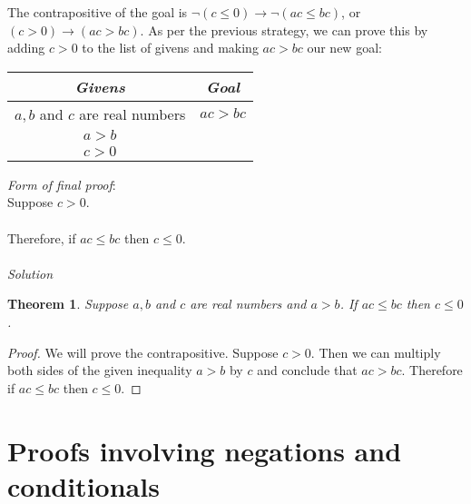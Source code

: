 \documentclass{report}
\newtheorem*{theorem}{Theorem}
\begin{document}
The contrapositive of the goal is $\neg(c\leq0)\to\neg(ac\leq bc)$, or $(c>0)\to(ac>bc)$. As per the previous strategy, we can prove this by adding $c>0$ to the list of givens 
and making $ac>bc$ our new goal:
\begin{center}
\begin{tabular}{c|c}
\textit{Givens}&\textit{Goal}\\
\hline
$a,b$ and $c$ are real numbers&$ac>bc$\\
$a>b$&\\
$c>0$&
\end{tabular}
\end{center}
\textit{Form of final proof}:\\
\indent Suppose $c>0$.\\
\indent{}\\
\indent Therefore, if $ac\leq bc$ then $c\leq0$.\\
\vspace{1mm}\\
\textit{Solution}
\begin{theorem}
Suppose $a,b$ and $c$ are real numbers and $a>b$. If $ac\leq bc$ then $c\leq0$.
\end{theorem}
\begin{proof}
We will prove the contrapositive. Suppose $c>0$. Then we can multiply both sides of the given inequality $a>b$ by $c$ and conclude that $ac>bc$. Therefore if $ac\leq bc$ then $c\leq0$.
\end{proof}
\newpage

\section{Proofs involving negations and conditionals}
\end{document}
